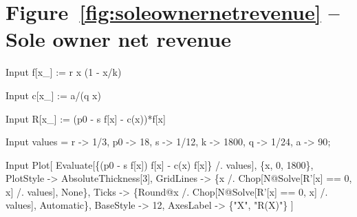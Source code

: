 \documentclass[11pt,fleqn]{book} %
\begin{document}
\section*{Figure~\ref{fig:soleownernetrevenue} -- Sole owner net revenue }
\small{
\begin{mmaCell}[index=1]{Input}
   f[x_] := r x (1 - x/k)
\end{mmaCell}

\begin{mmaCell}{Input}
   c[x_] := a/(q x)
\end{mmaCell}

\begin{mmaCell}{Input}
   R[x_] := (p0 - s f[x] - c(x))*f[x]
\end{mmaCell}

\begin{mmaCell}{Input}
   values = {r -> 1/3, p0 -> 18, s -> 1/12, k -> 1800, q -> 1/24, a -> 90};
\end{mmaCell}

\begin{mmaCell}{Input}
   Plot[
     Evaluate[\{(p0 - s f[x]) f[x] - c(x) f[x]\} /. values],
     \{x, 0, 1800\},
     PlotStyle -> AbsoluteThickness[3],
     GridLines -> \{x /. Chop[N@Solve[R'[x] == 0, x] /. values], None\}, 
     Ticks     -> \{Round@x /. Chop[N@Solve[R'[x] == 0, x] /. values], Automatic\}, 
     BaseStyle -> 12,
     AxesLabel -> \{"X", "R(X)"\}
   ]
\end{mmaCell}
}

\end{document}
